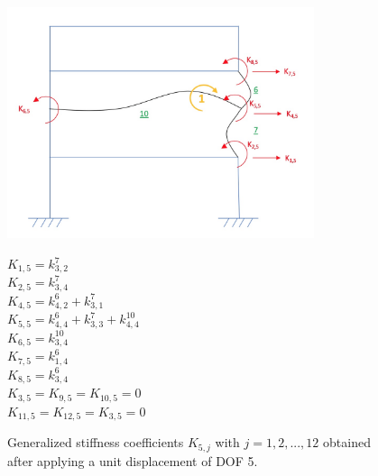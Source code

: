 \documentclass[11pt,a4paper,titlepage]{report}
\begin{document}
\begin{figure} [h]
\begin{minipage}{0.59\linewidth}
        \centering
         \includegraphics[width=9cm]{U=5.jpeg}
\end{minipage}
\begin{minipage}{0.4\linewidth}
\begin{small}
        $K_{1,5} = k^7_{3,2}$\\
        $K_{2,5} = k^7_{3,4}$\\
        $K_{4,5} = k^6_{4,2}+k^7_{3,1}$\\
        $K_{5,5} = k^6_{4,4}+k^7_{3,3}+k^{10}_{4,4}$\\
        $K_{6,5} = k^{10}_{3,4}$\\
        $K_{7,5} = k^6_{1,4}$\\
        $K_{8,5} = k^6_{3,4}$\\
        $K_{3,5} = K_{9,5} = K_{10,5} = 0$\\
        $K_{11,5} = K_{12,5} = K_{3,5} =0$\\
\end{small}
\end{minipage}
\caption{Generalized stiffness coefficients $K_{5,j}$ with $j=1,2,...,12$ obtained after applying a unit displacement of DOF 5.}
\label{fig: I.1 - u5=1}
\end{figure}
\end{document}
